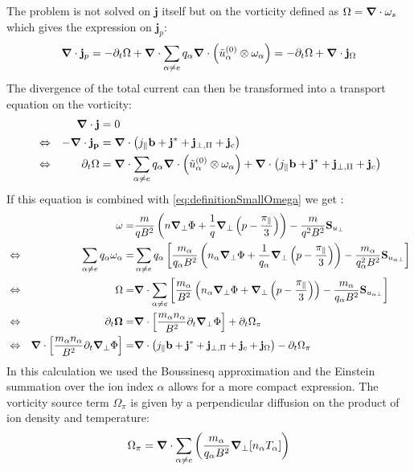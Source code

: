  The problem is not solved on $\mathbf{j}$ itself but on the vorticity defined as $\Omega = \grad\cdot\mathbf{\omega}_s$ which gives the expression on $\mathbf{j}_p$: 
 $$ \grad\cdot\mathbf{j}_p = -\partial_t\Omega + \grad\cdot\sum_{\alpha\neq e}q_\alpha\grad\cdot\left(\tilde{u}^{(0)}_\alpha\otimes\mathbf{\omega}_\alpha\right) = - \partial_t\Omega + \grad\cdot\mathbf{j}_\Omega $$
The divergence of the total current can then be transformed into a transport equation on the vorticity:
 \begin{align}
 	&& \grad\cdot\mathbf{j} &= 0 \nonumber \\
 	&\Leftrightarrow& -\grad\cdot\mathbf{j_p} &= \grad\cdot\left(j_\parallel\mathbf{b} + \mathbf{j}^* + \mathbf{j}_{\perp,\Pi} + \mathbf{j}_{c} \right) \nonumber \\
 	&\Leftrightarrow& \partial_t\Omega &= \grad\cdot\sum_{\alpha\neq e}q_\alpha\grad\cdot\left(\tilde{u}^{(0)}_\alpha\otimes\mathbf{\omega}_\alpha\right) +\grad\cdot\left(j_\parallel\mathbf{b} + \mathbf{j}^* + \mathbf{j}_{\perp,\Pi} + \mathbf{j}_{c} \right)
 	\label{eq:TransportEquationVorticity}
 \end{align}
If this equation is combined with \autoref{eq:definitionSmallOmega} we get :
 \begin{align}
 	&& \mathbf{\omega} =& \frac{m}{qB^2}\left(n\grad_\perp\Phi + \frac{1}{q}\grad_{\perp}\left(p-\frac{\pi_\parallel}{3}\right)\right) - \frac{m}{q^2B^2}\mathbf{S}_{u_\perp} \nonumber\\
	&\Leftrightarrow& \sum_{\alpha\neq e}q_\alpha\mathbf{\omega}_\alpha =& \sum_{\alpha\neq e}q_\alpha\left[\frac{m_\alpha}{q_\alpha B^2}\left(n_\alpha\grad_\perp\Phi + \frac{1}{q_\alpha}\grad_{\perp}\left(p-\frac{\pi_\parallel}{3}\right)\right) - \frac{m_\alpha}{q_\alpha^2B^2}\mathbf{S}_{u_{\alpha\perp}}\right] \nonumber\\
	&\Leftrightarrow& \Omega =& \grad\cdot\sum_{\alpha\neq e}\left[\frac{m_\alpha}{ B^2}\left(n_\alpha\grad_\perp\Phi + \grad_{\perp}\left(p-\frac{\pi_\parallel}{3}\right)\right) - \frac{m_\alpha}{q_\alpha B^2}\mathbf{S}_{u_{\alpha\perp}}\right] \nonumber \\
	&\Leftrightarrow& \partial_t\mathbf{\Omega} =& \grad\cdot\left[\frac{m_\alpha n_\alpha}{ B^2}\partial_t\grad_\perp\Phi\right] + \partial_t \Omega_\pi \nonumber \\
	&\Leftrightarrow& \grad\cdot\left[\frac{m_\alpha n_\alpha}{ B^2}\partial_t\grad_\perp\Phi\right]  =&  \grad\cdot\left(j_\parallel\mathbf{b} + \mathbf{j}^* + \mathbf{j}_{\perp,\Pi} + \mathbf{j}_{c} + \mathbf{j}_\Omega\right) - \partial_t \Omega_\pi \label{eq:FirstFormVorticityEquation}
 \end{align}
 In this calculation we used the Boussinesq approximation and the Einstein summation over the ion index $\alpha$ allows for a more compact expression. The vorticity source term $\Omega_\pi$ is given by a perpendicular diffusion on the product of ion density and temperature:
 $$ \Omega_\pi = \grad\cdot\sum_{\alpha\neq e}\left(\frac{m_\alpha}{q_\alpha B^2}\grad_\perp[n_\alpha T_\alpha]\right)$$


